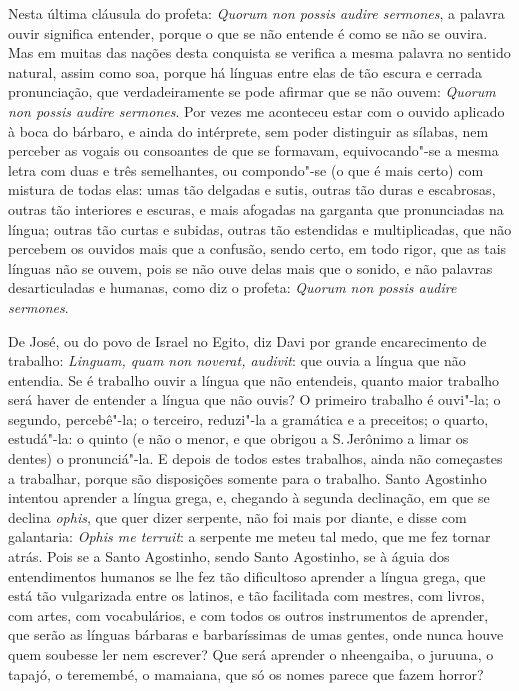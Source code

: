 Nesta última cláusula do profeta: \emph{Quorum non possis audire
sermones}, a palavra ouvir significa entender, porque o que se não
entende é como se não se ouvira. Mas em muitas das nações desta
conquista se verifica a mesma palavra no sentido natural, assim como
soa, porque há línguas entre elas de tão escura e cerrada pronunciação,
que verdadeiramente se pode afirmar que se não ouvem: \emph{Quorum non
possis audire sermones}. Por vezes me aconteceu estar com o ouvido
aplicado à boca do bárbaro, e ainda do intérprete, sem poder distinguir
as sílabas, nem perceber as vogais ou consoantes de que se formavam,
equivocando"-se a mesma letra com duas e três semelhantes, ou compondo"-se
(o que é mais certo) com mistura de todas elas: umas tão delgadas
e sutis, outras tão duras e escabrosas, outras tão interiores e escuras,
e mais afogadas na garganta que pronunciadas na língua; outras tão
curtas e subidas, outras tão estendidas e multiplicadas, que não
percebem os ouvidos mais que a confusão, sendo certo, em todo rigor, que
as tais línguas não se
ouvem, pois se não ouve delas mais que o sonido, e não palavras
desarticuladas e humanas, como diz o profeta: \emph{Quorum non possis
audire sermones}.

De José, ou do povo de Israel no Egito, diz Davi por grande
encarecimento de trabalho: \emph{Linguam, quam non noverat, audivit}:
que ouvia a língua que não entendia. Se é trabalho ouvir a língua
que não entendeis, quanto maior trabalho será haver de entender a língua
que não ouvis? O primeiro trabalho é ouvi"-la; o segundo, percebê"-la; o
terceiro, reduzi"-la a gramática e a preceitos; o quarto, estudá"-la: o
quinto (e não o menor, e que obrigou a S.\,Jerônimo a limar os dentes)
o pronunciá"-la. E depois de todos estes trabalhos, ainda não
começastes a trabalhar, porque são disposições somente para o trabalho.
Santo Agostinho intentou aprender a língua grega, e, chegando à segunda
declinação, em que se declina \emph{ophis}, que quer dizer serpente, não
foi mais por diante, e disse com galantaria: \emph{Ophis me terruit}: a
serpente me meteu tal medo, que me fez tornar atrás. Pois se a Santo
Agostinho, sendo Santo Agostinho, se à águia dos entendimentos humanos
se lhe fez tão dificultoso aprender a língua grega, que está tão
vulgarizada entre os latinos, e tão facilitada com mestres, com livros,
com artes, com vocabulários, e com todos os outros instrumentos de
aprender, que serão as línguas bárbaras e barbaríssimas de umas gentes,
onde nunca houve quem soubesse ler nem escrever? Que será aprender o
nheengaiba, o juruuna, o tapajó, o teremembé, o mamaiana, que só os
nomes parece que fazem horror?


